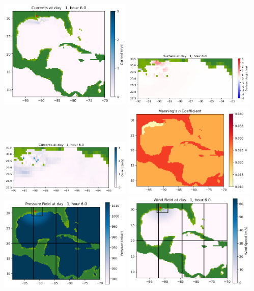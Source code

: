 \documentclass[11pt]{article}
\begin{document}
\includegraphics[width=0.475\textwidth]{frame0013fig1002.png}
\vskip 10pt 
\includegraphics[width=0.475\textwidth]{frame0013fig1003.png}
\includegraphics[width=0.475\textwidth]{frame0013fig1004.png}
\vskip 10pt 
\includegraphics[width=0.475\textwidth]{frame0013fig1005.png}
\includegraphics[width=0.475\textwidth]{frame0013fig1006.png}
\vskip 10pt 
\includegraphics[width=0.475\textwidth]{frame0013fig1007.png}
\end{document}
